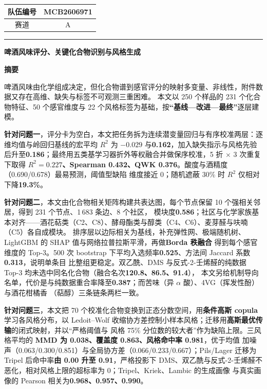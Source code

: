﻿\documentclass[UTF8,a4paper,zihao=-4]{ctexart}
\numberwithin{figure}{section}
\numberwithin{table}{section}
\numberwithin{equation}{section}
\begin{document}
\thispagestyle{empty}
\begin{center}
\begin{tabular}{|c|c|}
\hline
队伍编号 & MCB2606971 \\
\hline
赛道 & A \\
\hline
\end{tabular}
\end{center}
\vspace{0.8em}
\hrule
\vspace{0.8em}
\begin{center}
{\bfseries 啤酒风味评分、关键化合物识别与风格生成}
\end{center}
\vspace{0.1em}
\begin{center}
\textbf{ 摘\quad 要}
\end{center}

啤酒风味由化学组成决定，但化合物谱到感官评分的映射多变量、非线性，附件数据又存在高维、缺失与标签不可观测三重困难。
本文以 250 个样品的 231 个化合物特征、50 个感官维度与 22 个风格标签为基础，按\textbf{“基线—改进—最终”}逐层建模。

\textbf{针对问题一}，评分卡为空白，本文把任务拆为连续潜变量回归与有序校准两层：逐维均值与岭回归基线的宏平均 $R^2$ 为 $-0.029$ 
与\textbf{0.162}，加入缺失指示与风格先验后升至\textbf{0.186}；最终用五类基学习器折外等权融合并做保序校准，5 折 $\times$ 3 次重复
下取得\textbf{ $R^2=0.227$、Spearman 0.432、QWK 0.376}。酸度与酒精度（0.690/0.678）最易预测，阈值型缺陷
维度接近 0；随机遮蔽 30\% 时 $R^2$ 仅相对下降\textbf{19.3\%}。

\textbf{针对问题二}，本文由化合物相关矩阵构建共表达图，每个节点保留 10 个强相关邻居，得到 231 个节点、1\,683 条边、8 个社区，
模块度\textbf{0.586}；社区与化学家族基本对齐——酒花萜类（C2、C8）、酵母酯类与醇类（C4、C6）、麦芽醛与呋喃（C5）各自成模块。
排序层以边际相关为基线，补充弹性网、极端随机树、LightGBM 的 SHAP 值与网络拉普拉斯平滑，再做\textbf{Borda 秩融合}
得到每个感官维度的 Top-3。500 次 bootstrap 下平均入选频率\textbf{0.525}、方法间 Jaccard 系数\textbf{0.313}，说明单条目
比整组更稳定。双乙酰、DMS 与反式-2-壬烯醛的纯数据 Top-3 均未选中同名化合物（融合名次\textbf{120.8、86.5、91.4}），
本文另给机制导向名单，代价是与纯数据重合率降至\textbf{0.387}；而苦味（异 $\alpha$ 酸）、4VG（挥发性酚）与酒花柑橘香
（萜醇）三条链条两栏一致。

\textbf{针对问题三}，本文把 70 个校准化合物变换到正态分数空间，用\textbf{条件高斯 copula} 学习各风格分布，以 Ledoit--Wolf
收缩协方差控制小样本风格；迁移用\textbf{高斯最优传输}的闭式映射，并以“严格阈值与
风格 75\% 分位数的较大者”作为缺陷上限。三风格平均的\textbf{ MMD 为 0.038、覆盖度 0.863、风格命中率 0.981}，优于均值
加噪声（0.063/0.300/0.851）与全局协方差（0.066/0.233/0.667）；Pils/Lager 迁移为 Tripel 后命中率\textbf{由 0.00 升至
0.91}，严格投影下 DMS、双乙酰与反式-2-壬烯醛不恶化，相对风格上限的超标率为 0；Tripel、Kriek、Lambic 的生成画像
与真实画像的 Pearson 相关为\textbf{0.968、0.957、0.990}。
\end{document}
